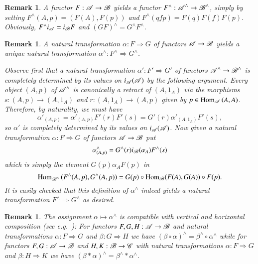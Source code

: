 \documentclass[1p]{elsarticle}
\theoremstyle{mythm}
\theoremstyle{mydef}
\newtheorem{Rem}[Thm]{Remark}
\begin{document}
\begin{Rem}
  \label{rem:functoriality-of-ic}
  A functor $F: \operatorname{\mathscr{A}} \to \operatorname{\mathscr{B}}$ yields a functor
  $F^{\wedge}: \operatorname{\mathscr{A}}^{\wedge} \to \operatorname{\mathscr{B}}^{\wedge}$, simply by setting
  $F^{\wedge}(A,p) = (F(A),F(p))$ and 
  $F^{\wedge}(qfp)= F(q) F(f) F(p)$. 
  Obviously, $F^{\wedge}i_{\operatorname{\mathscr{A}}} = i_{\operatorname{\mathscr{B}}}F$ and
  $(GF)^{\wedge} = G^{\wedge} F^{\wedge}$. 
\end{Rem}

\begin{Rem}
  \label{rem:2-functoriality-of-ic}
  A natural transformation
  $\alpha: F \Rightarrow G$ of functors $\operatorname{\mathscr{A}} \to \operatorname{\mathscr{B}}$ yields a
  unique natural transformation $\alpha^{\wedge}: F^{\wedge} \Rightarrow
  G^{\wedge}$.

  Observe first that a natural transformation $\alpha': F'
  \Rightarrow G'$ of functors $\operatorname{\mathscr{A}}^{\wedge} \to \operatorname{\mathscr{B}}^{\wedge}$ is
  completely determined by its values on $i_{\operatorname{\mathscr{A}}}{(\operatorname{\mathscr{A}})}$ by the
  following argument.
  Every object $(A,p)$ of $\operatorname{\mathscr{A}}^{\wedge}$ is canonically a
  retract of $(A,1_{A})$ via the morphisms $s: (A,p) \to (A,1_{A})$ and
  $r: (A, 1_{A}) \to (A,p)$ given by $p \in
  \operatorname{Hom}_{\operatorname{\mathscr{A}}}{(A,A)}$. Therefore, by naturality, we must have
  \[
  \alpha'_{(A,p)} = \alpha'_{(A,p)} F'(r) F'(s) = G'(r)
  \alpha'_{(A,1_{A})} F'(s),
  \]
  so $\alpha'$ is completely determined by its values on
  $i_{\operatorname{\mathscr{A}}}{(\operatorname{\mathscr{A}})}$. Now given a natural transformation
  $\alpha: F \Rightarrow G$ of functors $\operatorname{\mathscr{A}} \to \operatorname{\mathscr{B}}$ put
  \[
  \alpha^{\wedge}_{(A,p)} = 
  G^{\wedge}(r) i_{\operatorname{\mathscr{B}}}(\alpha_{A}) F^{\wedge}(s)
  \]
  which is simply the element $G(p) \alpha_{A} F(p)$ in
  \[
  \operatorname{Hom}_{\operatorname{\mathscr{B}}^{\wedge}} {(F^{\wedge}(A,p), G^{\wedge}(A,p))} = 
  G(p)\circ \operatorname{Hom}_{\operatorname{\mathscr{B}}}(F(A),G(A)) \circ F(p).
  \]
  It is easily checked that this definition of $\alpha^{\wedge}$ indeed yields
  a natural transformation $F^{\wedge} \Rightarrow G^{\wedge}$ as
  desired.
\end{Rem}
  

\begin{Rem}
  \label{rem:strict-2-functoriality-of-ic}
  The assignment $\alpha \mapsto \alpha^{\wedge}$ is
  compatible with vertical and horizontal composition 
  (see e.g.~\cite[II.5, p.~42f]{MR1712872}): For functors
  $F,G,H: \operatorname{\mathscr{A}} \to \operatorname{\mathscr{B}}$ and  natural transformations
  $\alpha:F \Rightarrow G$ and $\beta: G \Rightarrow H$ we have 
  $(\beta \circ \alpha)^{\wedge} = \beta^{\wedge} \circ \alpha^{\wedge}$ 
  while for functors $F,G: \operatorname{\mathscr{A}} \to \operatorname{\mathscr{B}}$ and
  $H,K:\operatorname{\mathscr{B}} \to \operatorname{\mathscr{C}}$ with natural transformations $\alpha:F
  \Rightarrow G$ and $\beta: H \Rightarrow K$ 
  we have $(\beta \ast \alpha)^{\wedge} = \beta^{\wedge} \ast
  \alpha^{\wedge}$.
\end{Rem}
\end{document}
